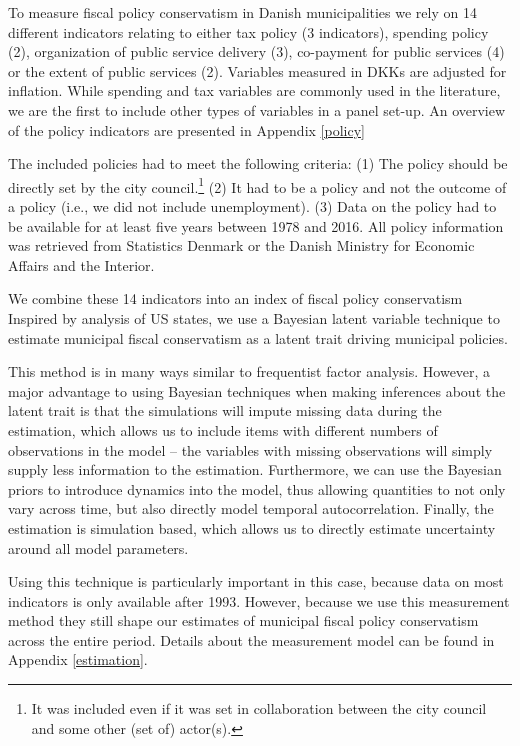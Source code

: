 \documentclass[a4paper,12pt]{article}
\begin{document}
To measure fiscal policy conservatism in Danish municipalities we rely on 14 different indicators relating to either tax policy (3 indicators), spending policy (2), organization of public service delivery (3), co-payment for public services (4) or the extent of public services (2). Variables measured in DKKs are adjusted for inflation. While  spending and tax variables are commonly used in the literature, we are the first to include other types of variables in a panel set-up. An overview of the policy indicators are presented in Appendix \ref{policy}

The included policies had to meet the following criteria: (1) The policy should be directly set by the city council.\footnote{It was included even if it was set in collaboration between the city council and some other (set of) actor(s).} (2) It had to be a policy and not the outcome of a policy (i.e., we did not include unemployment). (3) Data on the policy had to be available for at least five years between 1978 and 2016. All policy information was retrieved from Statistics Denmark or the Danish Ministry for Economic Affairs and the Interior.

We combine these 14 indicators into an index of fiscal policy conservatism Inspired by \cite{caughey2016dynamics} analysis of US states, we use a Bayesian latent variable technique to estimate municipal fiscal conservatism as a latent trait driving municipal policies. 

This method is in many ways similar to frequentist factor analysis. However, a major advantage to using Bayesian techniques when making inferences about the latent trait is that the simulations will impute missing data during the estimation, which allows us to include items with different numbers of observations in the model -- the variables with missing observations will simply supply less information to the estimation. Furthermore, we can use the Bayesian priors to introduce dynamics into the model, thus allowing quantities to not only vary across time, but also directly model temporal autocorrelation. Finally, the estimation is simulation based, which allows us to directly estimate uncertainty around all model parameters.

Using this technique is particularly important in this case, because data on most indicators is only available after 1993. However, because we use this measurement method they still shape our estimates of municipal fiscal policy conservatism across the entire period. Details about the measurement model can be found in Appendix \ref{estimation}. 
\end{document}
